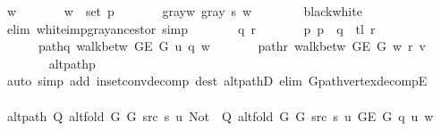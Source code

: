 \begin{isabellebody}
\ w\ \isanewline
\ \ \ \ \ \ {\isachardoublequoteopen}w\ {\isasymin}\ set\ p{\isachardoublequoteclose}\ \isanewline
\ \ \ \ \ \ gray{\isacharunderscore}{\kern0pt}w{\isacharcolon}{\kern0pt}\ {\isachardoublequoteopen}gray\ s\ w{\isachardoublequoteclose}\isanewline
\ \ \ \ \ \ \isamarkupfalse%
\ black{\isacharunderscore}{\kern0pt}white\isanewline
\ \ \ \ \ \ \isamarkupfalse%
\ {\isacharparenleft}{\kern0pt}elim\ white{\isacharunderscore}{\kern0pt}imp{\isacharunderscore}{\kern0pt}gray{\isacharunderscore}{\kern0pt}ancestor{\isacharparenright}{\kern0pt}\ simp{\isacharplus}{\kern0pt}\isanewline
\ \ \ \ \isamarkupfalse%
\ \isamarkupfalse%
\ q\ r\ \isanewline
\ \ \ \ \ \ p{\isacharcolon}{\kern0pt}\ {\isachardoublequoteopen}p\ {\isacharequal}{\kern0pt}\ q\ {\isacharat}{\kern0pt}\ tl\ r{\isachardoublequoteclose}\ \isanewline
\ \ \ \ \ \ path{\isacharunderscore}{\kern0pt}q{\isacharcolon}{\kern0pt}\ {\isachardoublequoteopen}walk{\isacharunderscore}{\kern0pt}betw\ {\isacharparenleft}{\kern0pt}G{\isachardot}{\kern0pt}E\ G{\isacharparenright}{\kern0pt}\ u\ q\ w{\isachardoublequoteclose}\ \isanewline
\ \ \ \ \ \ path{\isacharunderscore}{\kern0pt}r{\isacharcolon}{\kern0pt}\ {\isachardoublequoteopen}walk{\isacharunderscore}{\kern0pt}betw\ {\isacharparenleft}{\kern0pt}G{\isachardot}{\kern0pt}E\ G{\isacharparenright}{\kern0pt}\ w\ r\ v{\isachardoublequoteclose}\isanewline
\ \ \ \ \ \ \isamarkupfalse%
\ alt{\isacharunderscore}{\kern0pt}path{\isacharunderscore}{\kern0pt}p\isanewline
\ \ \ \ \ \ \isamarkupfalse%
\ {\isacharparenleft}{\kern0pt}auto\ simp\ add{\isacharcolon}{\kern0pt}\ in{\isacharunderscore}{\kern0pt}set{\isacharunderscore}{\kern0pt}conv{\isacharunderscore}{\kern0pt}decomp\ dest{\isacharcolon}{\kern0pt}\ alt{\isacharunderscore}{\kern0pt}pathD{\isacharparenleft}{\kern0pt}{}{\isacharparenright}{\kern0pt}\ elim{\isacharcolon}{\kern0pt}\ G{\isachardot}{\kern0pt}path{\isacharunderscore}{\kern0pt}vertex{\isacharunderscore}{\kern0pt}decompE{\isacharparenright}{\kern0pt}\isanewline
\ \ \ \ \isamarkupfalse%
\ {\isachardoublequoteopen}alt{\isacharunderscore}{\kern0pt}path\ {\isacharparenleft}{\kern0pt}Q\ {\isacharparenleft}{\kern0pt}alt{\isacharunderscore}{\kern0pt}fold\ G{}\ G{}\ src\ s{\isacharparenright}{\kern0pt}\ u{\isacharparenright}{\kern0pt}\ {\isacharparenleft}{\kern0pt}Not\ {\isasymcirc}\ Q\ {\isacharparenleft}{\kern0pt}alt{\isacharunderscore}{\kern0pt}fold\ G{}\ G{}\ src\ s{\isacharparenright}{\kern0pt}\ u{\isacharparenright}{\kern0pt}\ {\isacharparenleft}{\kern0pt}G{\isachardot}{\kern0pt}E\ G{\isacharparenright}{\kern0pt}\ q\ u\ w{\isachardoublequoteclose}\isanewline

\end{isabellebody}
